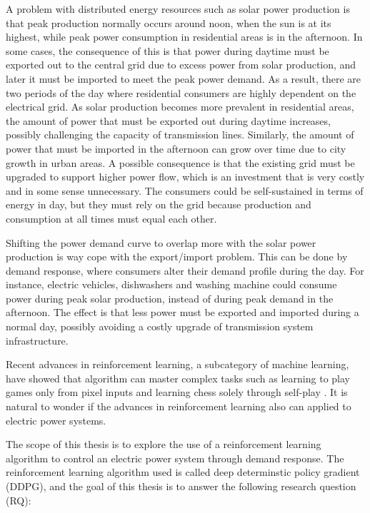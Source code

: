 \documentclass[class=book, crop=false]{standalone}
\begin{document}
A problem with distributed energy resources such as solar power production is that peak production normally occurs around noon, when the sun is at its highest, while peak power consumption in residential areas is in the afternoon. In some cases, the consequence of this is that power during daytime must be exported out to the central grid due to excess power from solar production, and later it must be imported to meet the peak power demand. As a result, there are two periods of the day where residential consumers are highly dependent on the electrical grid. As solar production becomes more prevalent in residential areas, the amount of power that must be exported out during daytime increases, possibly challenging the capacity of transmission lines. Similarly, the amount of power that must be imported in the afternoon can grow over time due to city growth in urban areas. A possible consequence is that the existing grid must be upgraded to support higher power flow, which is an investment that is very costly and in some sense unnecessary. The consumers could be self-sustained in terms of energy in day, but they must rely on the grid because production and consumption at all times must equal each other.

Shifting the power demand curve to overlap more with the solar power production is way cope with the export/import problem. This can be done by demand response, where consumers alter their demand profile during the day. For instance, electric vehicles, dishwashers and washing machine could consume power during peak solar production, instead of during peak demand in the afternoon. The effect is that less power must be exported and imported during a normal day, possibly avoiding a costly upgrade of transmission system infrastructure.

Recent advances in reinforcement learning, a subcategory of machine learning, have showed that algorithm can master complex tasks such as learning to play games only from pixel inputs and learning chess solely through self-play \cite{DQN_Mnih_et_al_2013}\cite{alphazero}. It is natural to wonder if the advances in reinforcement learning also can applied to electric power systems.

The scope of this thesis is to explore the use of a reinforcement learning algorithm to control an electric power system through demand response. The reinforcement learning algorithm used is called deep determinstic policy gradient (DDPG), and the goal of this thesis is to answer the following research question (RQ):
\end{document}
